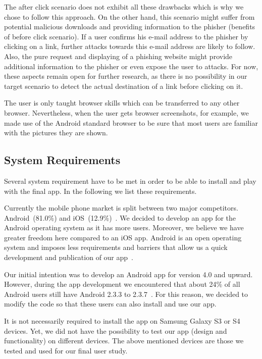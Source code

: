 \begin{description}[leftmargin=0cm]
The after click scenario does not exhibit all these drawbacks which is why we chose to follow this approach.
On the other hand, this scenario might suffer from potential malicious downloads and providing information to the phisher (benefits of before click scenario).
If a user confirms his e-mail address to the phisher by clicking on a link, further attacks towards this e-mail address are likely to follow.
Also, the pure request and displaying of a phishing website might provide additional information to the phisher or even expose the user to attacks.
For now, these aspects remain open for further research, as there is no possibility in our target scenario to detect the actual destination of a link before clicking on it.

	\item[Considered Browser:] The user is only taught browser skills which can be transferred to any other browser.
Nevertheless, when the user gets browser screenshots, for example, we made use of the Android standard browser to be sure that most users are familiar with the pictures they are shown.
\end{description}	

\subsection{System Requirements}
\label{s:sys_requirements}
Several system requirement have to be met in order to be able to install and play with the final app.
In the following we list these requirements.


\begin{description}[leftmargin=0cm]
	\item[Android:] Currently the mobile phone market is split between two major competitors. Android~(81.0\%) and iOS~(12.9\%)~\cite{androidiosmarketshare}. 
	We decided to develop an app for the Android operating system as it has more users. Moreover, we believe we have greater freedom here compared to an iOS app. 
 	Android is an open operating system and imposes less requirements and barriers that allow us a quick development and publication of our app~\cite{publishios, publishandroid}. 
	\item[Version:] Our initial intention was to develop an Android app for version 4.0 and upward.
 However, during the app development we encountered that about 24\% of all Android users still have Android 2.3.3 to 2.3.7~\cite{versionsandroid}. For this reason, we decided to modify the code so that these users can also install and use our app.
	\item[Samsung Galaxy S3 or S4:] It is not necessarily required to install the app on Samsung Galaxy S3 or S4 devices. 
Yet, we did not have the possibility to test our app (design and functionality) on different devices.
The above mentioned devices are those we tested and used for our final user study.
\end{description}

